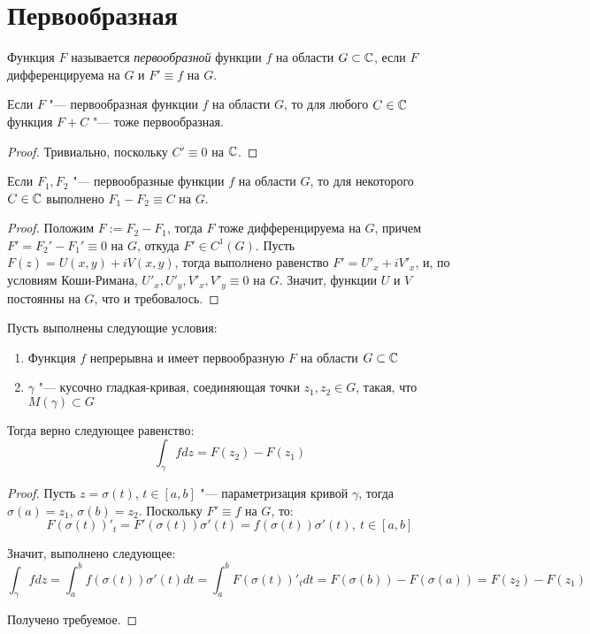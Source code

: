 \section{Первообразная}

\begin{definition}
	Функция $F$ называется \textit{первообразной} функции $f$ на области $G \subset \mathbb{C}$, если $F$ дифференцируема на $G$ и $F' \equiv f$ на $G$.
\end{definition}

\begin{note}
	Если $F$ "--- первообразная функции $f$ на области $G$, то для любого $C \in \mathbb{C}$ функция $F + C$ "--- тоже первообразная.
\end{note}

\begin{proof}
	Тривиально, поскольку $C' \equiv 0$ на $\mathbb{C}$.
\end{proof}

\begin{proposition}
	Если $F_1, F_2$ "--- первообразные функции $f$ на области $G$, то для некоторого $C \in \mathbb{C}$ выполнено $F_1 - F_2 \equiv C$ на $G$.
\end{proposition}

\begin{proof}
	Положим $F := F_2 - F_1$, тогда $F$ тоже дифференцируема на $G$, причем $F' = F_2' - F_1' \equiv 0$ на $G$, откуда $F' \in C^1(G)$. Пусть $F(z) = U(x, y) + iV(x, y)$, тогда выполнено равенство $F' = U'_x +iV'_x$, и, по условиям Коши-Римана, $U'_x, U'_y, V'_x, V'_y \equiv 0$ на $G$. Значит, функции $U$ и $V$ постоянны на $G$, что и требовалось.
\end{proof}

\begin{proposition}
	Пусть выполнены следующие условия:
	\begin{enumerate}
		\item Функция $f$ непрерывна и имеет первообразную $F$ на области $G \subset \mathbb{C}$
		\item $\gamma$ "--- кусочно гладкая-кривая, соединяющая точки $z_1, z_2 \in G$, такая, что $M(\gamma) \subset G$
	\end{enumerate}
	
	Тогда верно следующее равенство:
	\[\int_{\gamma}fdz = F(z_2) - F(z_1)\]
\end{proposition}

\begin{proof}
	Пусть $z = \sigma(t)$, $t \in [a, b]$ "--- параметризация кривой $\gamma$, тогда $\sigma(a) = z_1$, $\sigma(b) = z_2$. Поскольку $F' \equiv f$ на $G$, то:
	\[F(\sigma(t))'_t = F'(\sigma(t))\sigma'(t) = f(\sigma(t))\sigma'(t),~t \in [a, b]\]
	
	Значит, выполнено следующее:
	\[\int_\gamma fdz = \int_a^b f(\sigma(t))\sigma'(t)dt = \int_a^b F(\sigma(t))'_t dt = F(\sigma(b)) - F(\sigma(a)) = F(z_2) - F(z_1)\]
	
	Получено требуемое.
\end{proof}

